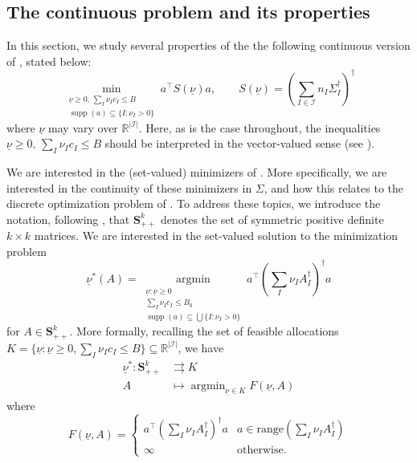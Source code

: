 \documentclass{article} %
\newcommand{\R}{\mathbb{R}}
\DeclareMathOperator{\supp}{supp}
\newcommand{\ul}[1]{\underline{#1}}
\DeclareMathOperator{\argmin}{argmin}
\begin{document}
\subsection{The continuous problem and its properties}\label{sec:continuous_problem}
In this section, we study several properties of the the following continuous version of , stated below:
\begin{equation}\label{eqn:continous-problem}
    \min_{\substack{\ul{\nu}\geq0,\, \sum_I \nu_I c_I\leq B \\ \supp(a) \subseteq \{I:\nu_I>0\}}} a^\top S(\ul{\nu})a,\quad\quad S(\ul{\nu}) = \left(\sum_{I\in\mathcal{I}} n_I\Sigma_I^\dagger\right)^\dagger
\end{equation}
where $\ul{\nu}$ may vary over $\R^{|\mathcal{I}|}$. Here, as is the case throughout, the inequalities $\ul{\nu}\geq0,\, \sum_I \nu_I c_I\leq B $ should be interpreted in the vector-valued sense (see ).

We are interested in the (set-valued) minimizers of . More specifically, we are interested in the continuity of these minimizers in $\Sigma$, and how this relates to the discrete optimization problem of .
To address these topics, we introduce the notation, following \citet{boyd}, that $\mathbf{S}^k_{++}$ denotes the set of symmetric positive definite $k\times k$ matrices. We are interested in the set-valued solution to the minimization problem
\begin{equation}\label{eqn:nu}
        \underline{\nu}^*(A) = \underset{\substack{\ul{\nu} :\ul{\nu}\geq0 \\ \sum_I \nu_Ic_I\leq B_0 \\ \supp(a)\subseteq \bigcup\{I:\nu_I>0\}}}{\argmin} a^\top \left(\sum_I \nu_I A_I^\dagger \right)^\dagger a
\end{equation}
for $A\in \mathbf{S}^k_{++}$. More formally, recalling the set of feasible allocations $K=\{\ul{\nu}:\ul{\nu}\geq0,\sum_I\nu_Ic_I\leq B\}\subseteq \R^{|\mathcal{I}|}$, we have
\begin{equation}\label{eqn:nustar}
\begin{split}
    \ul{\nu}^*:\mathbf{S}^k_{++}&\rightrightarrows K \\
    A&\mapsto \argmin_{\ul{\nu}\in K} F(\ul{\nu},A)
\end{split}    
\end{equation}
where
\begin{equation}\label{eqn:F}
F(\ul{\nu},A)=\begin{cases}
    a^\top \left(\sum_I \nu_I A_I^\dagger \right)^\dagger a & a \in \text{range}\left(\sum_I\nu_I A_I^\dagger\right) \\
    \infty & \text{otherwise.}    
\end{cases}
\end{equation}
\end{document}
